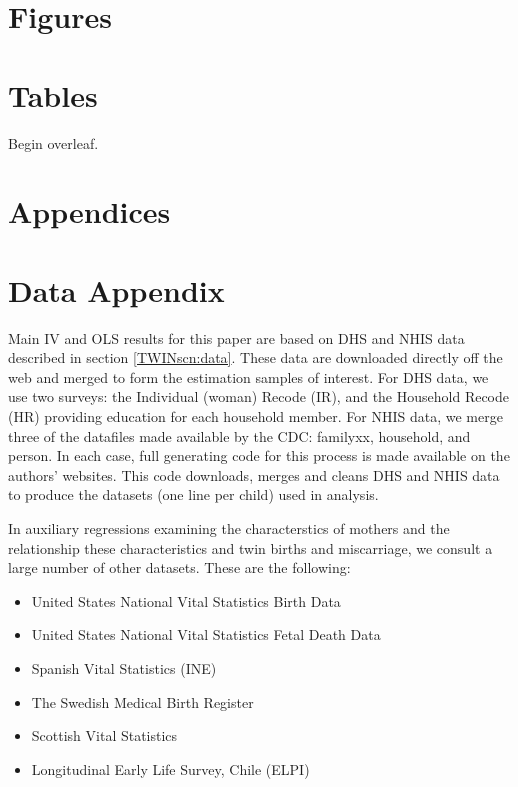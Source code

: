 

\newpage
\section*{Figures}


\section*{Tables}
Begin overleaf.

\clearpage

\appendix
\section*{Appendices}
\section{Data Appendix}
\label{TWINscn:dataApp}
Main IV and OLS results for this paper are based on DHS and NHIS data described 
in section \ref{TWINscn:data}.  These data are downloaded directly off the web 
and merged to form the estimation samples of interest. For DHS data, we use two 
surveys: the Individual (woman) Recode (IR), and the Household Recode (HR) 
providing education for each household member.  For NHIS data, we merge three 
of the datafiles made available by the CDC: familyxx, household, and person.
In each case, full generating code for this process is made available on the
authors' websites.  This code downloads, merges and cleans DHS and NHIS data to
produce the datasets (one line per child) used in analysis.

In auxiliary regressions examining the characterstics of mothers and the 
relationship these characteristics and twin births and miscarriage, we consult
a large number of other datasets.  These are the following:
\begin{itemize}
\item United States National Vital Statistics Birth Data
\item United States National Vital Statistics Fetal Death Data
\item Spanish Vital Statistics (INE)
\item The Swedish Medical Birth Register
\item Scottish Vital Statistics
\item Longitudinal Early Life Survey, Chile (ELPI) 
\end{itemize}

